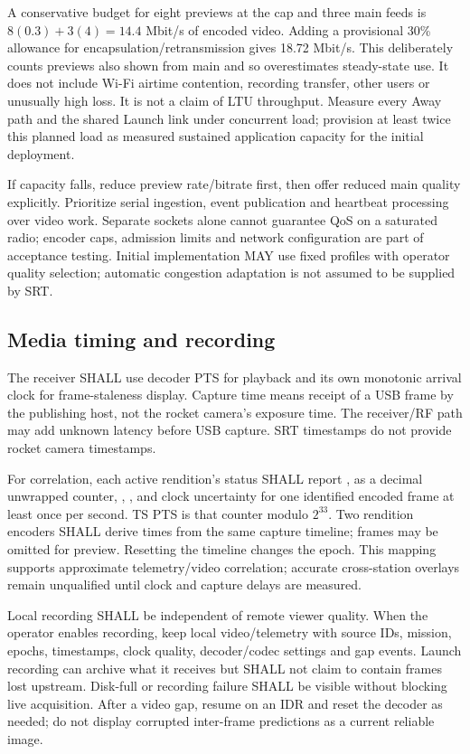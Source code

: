 A conservative budget for eight previews at the cap and three main feeds is
$8(0.3)+3(4)=14.4$ Mbit/s of encoded video. Adding a provisional 30\% allowance
for encapsulation/retransmission gives 18.72 Mbit/s. This deliberately counts
previews also shown from main and so overestimates steady-state use. It does not
include Wi-Fi airtime contention, recording transfer, other users or unusually
high loss. It is not a claim of LTU throughput. Measure every Away path and the
shared Launch link under concurrent load; provision at least twice this planned
load as measured sustained application capacity for the initial deployment.

If capacity falls, reduce preview rate/bitrate first, then offer reduced main
quality explicitly. Prioritize serial ingestion, event publication and heartbeat
processing over video work. Separate sockets alone cannot guarantee QoS on a
saturated radio; encoder caps, admission limits and network configuration are
part of acceptance testing. Initial implementation MAY use fixed profiles with
operator quality selection; automatic congestion adaptation is not assumed to
be supplied by SRT.

\subsection{Media timing and recording}
The receiver SHALL use decoder PTS for playback and its own monotonic arrival
clock for frame-staleness display. Capture time means receipt of a USB frame by
the publishing host, not the rocket camera's exposure time. The receiver/RF path
may add unknown latency before USB capture. SRT timestamps do not provide rocket
camera timestamps.

For correlation, each active rendition's status SHALL report ,
 as a decimal unwrapped counter, ,
, and clock uncertainty for one identified encoded frame
at least once per second. TS PTS is that counter modulo $2^{33}$. Two rendition
encoders SHALL derive times from the same capture timeline; frames may be omitted
for preview. Resetting the timeline changes the epoch. This mapping supports
approximate telemetry/video correlation; accurate cross-station overlays remain
unqualified until clock and capture delays are measured.

Local recording SHALL be independent of remote viewer quality. When the operator
enables recording, keep local video/telemetry with source IDs, mission, epochs,
timestamps, clock quality, decoder/codec settings and gap events. Launch recording
can archive what it receives but SHALL not claim to contain frames lost upstream.
Disk-full or recording failure SHALL be visible without blocking live acquisition.
After a video gap, resume on an IDR and reset the decoder as needed; do not display
corrupted inter-frame predictions as a current reliable image.
